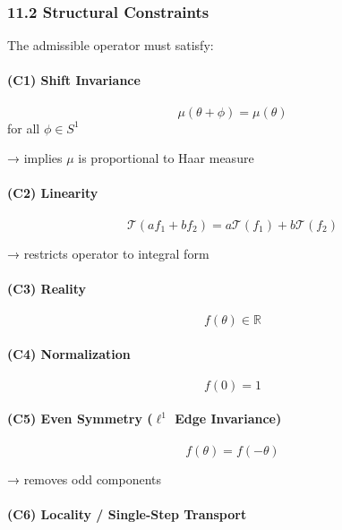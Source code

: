 \documentclass[
]{article}
\begin{document}
\subsubsection{11.2 Structural
Constraints}\label{structural-constraints}

The admissible operator must satisfy:

\paragraph{(C1) Shift Invariance}\label{c1-shift-invariance}

\[
\mu(\theta + \phi) = \mu(\theta)
\] for all \(\phi \in S^1\)

→ implies \(\mu\) is proportional to Haar measure

\paragraph{(C2) Linearity}\label{c2-linearity}

\[
\mathcal{T}(a f_1 + b f_2) = a \mathcal{T}(f_1) + b \mathcal{T}(f_2)
\]

→ restricts operator to integral form

\paragraph{(C3) Reality}\label{c3-reality}

\[
f(\theta) \in \mathbb{R}
\]

\paragraph{(C4) Normalization}\label{c4-normalization}

\[
f(0) = 1
\]

\paragraph{\texorpdfstring{(C5) Even Symmetry (\(\ell^1\) Edge
Invariance)}{(C5) Even Symmetry (\textbackslash ell\^{}1 Edge Invariance)}}\label{c5-even-symmetry-ell1-edge-invariance}

\[
f(\theta) = f(-\theta)
\]

→ removes odd components

\paragraph{(C6) Locality / Single-Step
Transport}\label{c6-locality-single-step-transport}
\end{document}
